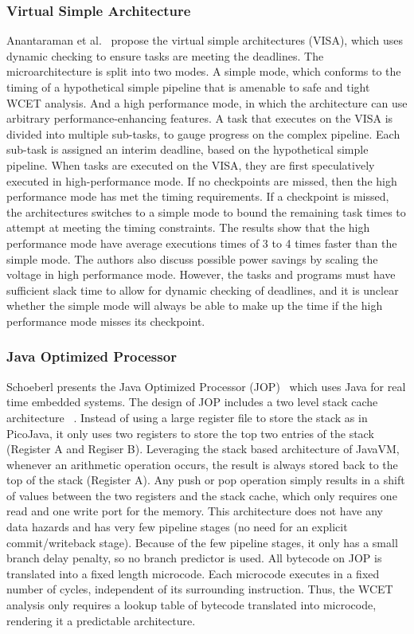 \subsubsection{Virtual Simple Architecture}
Anantaraman et al.~\cite{Anantaraman2003VISA} propose the virtual simple architectures (VISA), which uses dynamic checking to ensure tasks are meeting the deadlines. 
The microarchitecture is split into two modes. 
A simple mode, which conforms to the timing of a hypothetical simple pipeline that is amenable to safe and tight WCET analysis. 
And a high performance mode, in which the architecture can use arbitrary performance-enhancing features.
A task that executes on the VISA is divided into multiple sub-tasks, to gauge progress on the complex pipeline.
Each sub-task is assigned an interim deadline, based on the hypothetical simple pipeline.  
When tasks are executed on the VISA, they are first speculatively executed in high-performance mode.
If no checkpoints are missed, then the high performance mode has met the timing requirements. 
If a checkpoint is missed, the architectures switches to a simple mode to bound the remaining task times to attempt at meeting the timing constraints.
The results show that the high performance mode have average executions times of 3 to 4 times faster than the simple mode.
The authors also discuss possible power savings by scaling the voltage in high performance mode.
However, the tasks and programs must have sufficient slack time to allow for dynamic checking of deadlines, and it is unclear whether the simple mode will always be able to make up the time if the high performance mode misses its checkpoint. 

\subsubsection{Java Optimized Processor}
\label{sec:RTJava}
Schoeberl presents the Java Optimized Processor (JOP)~\cite{jop:wcet} which uses Java for real time embedded systems. 
The design of JOP includes a two level stack cache architecture ~\cite{jop:stack}. 
Instead of using a large register file to store the stack as in PicoJava\cite{McGhan1998PicoJava}, it only uses two registers to store the top two entries of the stack (Register A and Regiser B). 
Leveraging the stack based architecture of JavaVM, whenever an arithmetic operation occurs, the result is always stored back to the top of the stack (Register A). 
Any push or pop operation simply results in a shift of values between the two registers and the stack cache, which only requires one read and one write port for the memory. 
This architecture does not have any data hazards and has very few pipeline stages (no need for an explicit commit/writeback stage). 
Because of the few pipeline stages, it only has a small branch delay penalty, so no branch predictor is used.
All bytecode on JOP is translated into a fixed length microcode. 
Each microcode executes in a fixed number of cycles, independent of its surrounding instruction.
Thus, the WCET analysis only requires a lookup table of bytecode translated into microcode, rendering it a predictable architecture. 

